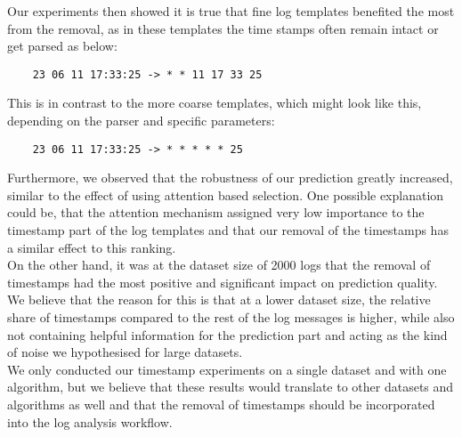 Our experiments then showed it is true that fine log templates benefited the most from the removal, as in these templates the time stamps often remain intact or get parsed as below:
\begin{verbatim}
    23 06 11 17:33:25 -> * * 11 17 33 25
\end{verbatim}

This is in contrast to the more coarse templates, which might look like this, depending on the parser and specific parameters:
\begin{verbatim}
    23 06 11 17:33:25 -> * * * * * 25 
\end{verbatim}

Furthermore, we observed that the robustness of our prediction greatly increased, similar to the effect of using attention based selection. One possible explanation could be, that the attention mechanism assigned very low importance to the timestamp part of the log templates and that our removal of the timestamps has a similar effect to this ranking. \\ 

On the other hand, it was at the dataset size of 2000 logs that the removal of timestamps had the most positive and significant impact on prediction quality. We believe that the reason for this is that at a lower dataset size, the relative share of timestamps compared to the rest of the log messages is higher, while also not containing helpful information for the prediction part and acting as the kind of noise we hypothesised for large datasets. \\

We only conducted our timestamp experiments on a single dataset and with one algorithm, but we believe that these results would translate to other datasets and algorithms as well and that the removal of timestamps should be incorporated into the log analysis workflow. 
